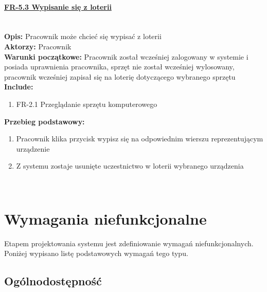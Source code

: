 \paragraph{\underline{FR-5.3 Wypisanie się z loterii}}\mbox{}\\[1mm]
	\noindent\textbf{Opis:} Pracownik może chcieć się wypisać z loterii\\
	\noindent\textbf{Aktorzy:} Pracownik\\
	\textbf{Warunki początkowe:} Pracownik został wcześniej zalogowany w systemie i posiada uprawnienia pracownika, sprzęt nie został wcześniej wylosowany, pracownik wcześniej zapisał się na loterię dotyczącego wybranego sprzętu\\
	\textbf{Include:} 
	\begin{enumerate}[noparskip]
		\item FR-2.1 Przeglądanie sprzętu komputerowego
	\end{enumerate}
  \textbf{Przebieg podstawowy:}
	\begin{enumerate}[noparskip]
		\item Pracownik klika przycisk wypisz się na odpowiednim wierszu reprezentującym urządzenie
		\item Z systemu zostaje usunięte uczestnictwo w loterii wybranego urządzenia
  \end{enumerate} \mbox{}\\[-11mm]

\section{Wymagania niefunkcjonalne}

Etapem projektowania systemu jest zdefiniowanie wymagań niefunkcjonalnych. Poniżej wypisano listę podstawowych wymagań tego typu.

\subsection{Ogólnodostępność}

